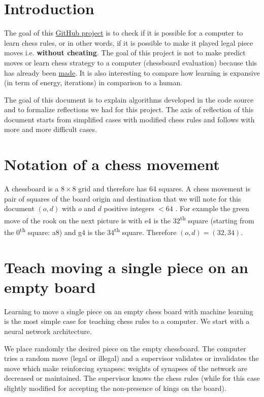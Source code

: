 \documentclass[a4paper,10pt]{article}
\begin{document}
%
\newcommand{\norm}[1]{\left\lVert#1\right\rVert}

\section*{Introduction}

The goal of this \href{https://github.com/Lecrapouille/ChessNeuNeu}{GitHub
  project} is to check if it is possible for a computer to learn chess rules, or
in other words, if it is possible to make it played legal piece moves
i.e. \textbf{without cheating}. The goal of this project is not to make predict
moves or learn chess strategy to a computer (chessboard evaluation) because this
has already been \href{https://github.com/ashudeep/ConvChess}{made}. It is also
interesting to compare how learning is expansive (in term of energy, iterations)
in comparison to a human.

The goal of this document is to explain algorithms developed in the code source
and to formalize reflections we had for this project. The axis of reflection of
this document starts from simplified cases with modified chess rules and follows
with more and more difficult cases.

\section{Notation of a chess movement}
A chessboard is a $8 \times 8$ grid and therefore has 64 squares. A chess
movement is pair of squares of the board origin and destination that we will
note for this document $(o, d)$ with $o$ and $d$ positive integers $< 64$ . For
example the green move of the rook on the next picture is  with e4
is the 32\textsuperscript{th} square (starting from the 0\textsuperscript{th}
square: a8) and g4 is the 34\textsuperscript{th} square. Therefore $(o, d) =
(32, 34)$.

\section{Teach moving a single piece on an empty board}

Learning to move a single piece on an empty chess board with machine learning is
the most simple case for teaching chess rules to a computer. We start with a
neural network architecture.

We place randomly the desired piece on the empty chessboard. The computer tries
a random move (legal or illegal) and a supervisor validates or invalidates the
move which make reinforcing synapses: weights of synapses of the network are
decreased or maintained. The supervisor knows the chess rules (while for this
case slightly modified for accepting the non-presence of kings on the board).
\end{document}
